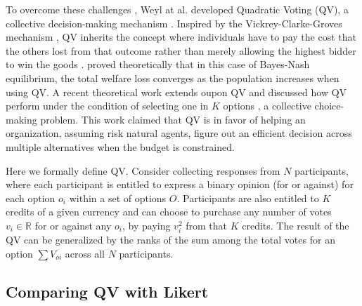 To overcome these challenges \cite{posner2018radical}, Weyl at al. developed Quadratic Voting (QV), a collective decision-making mechanism \cite{lalley2018quadratic}. Inspired by the Vickrey-Clarke-Groves mechanism \cite{roughgarden2010algorithmic}, QV inherits the concept where individuals have to pay the cost that the others lost from that outcome rather than merely allowing the highest bidder to win the goods \cite{posner2018radical}. \textcite{lalley2018quadratic} proved theoretically that in this case of Bayes-Nash equilibrium, the total welfare loss converges as the population increases when using QV. A recent theoretical work extends oupon QV and discussed how QV perform under the condition of selecting one in $K$ options \cite{eguia2019quadratic}, a collective choice-making problem. This work claimed that QV is in favor of helping an organization, assuming risk natural agents, figure out an efficient decision across multiple alternatives when the budget is constrained. \par

Here we formally define QV. Consider collecting responses from $N$ participants, where each participant is entitled to express a binary opinion (for or against) for each option $o_i$ within a set of options $O$. Participants are also entitled to $K$ credits of a given currency and can choose to purchase any number of votes $v_i \in \mathbb{R}$ for or against any $o_i$, by paying $v_i^2$ from that $K$ credits. The result of the QV can be generalized by the ranks of the sum among the total votes for an option $\sum{V_{oi}}$ across all $N$ participants.\par


\subsection{Comparing QV with Likert}


